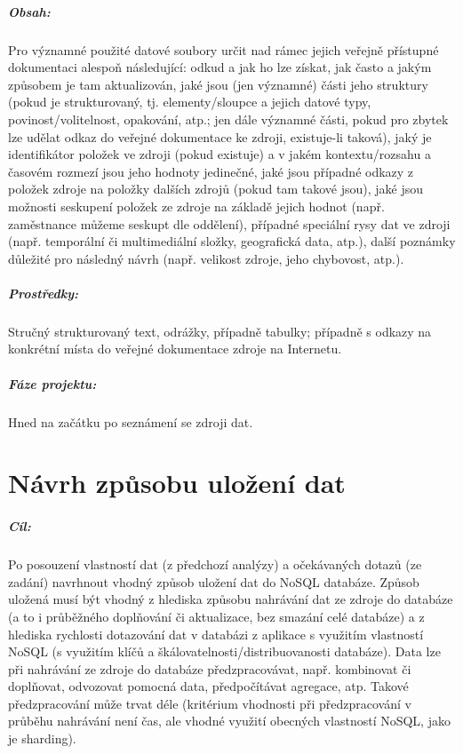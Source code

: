 \documentclass[10pt,xcolor=pdflatex,dvipsnames,table,oneside]{book}
\begin{document}
\paragraph{Obsah:}
Pro významné použité datové soubory určit nad rámec jejich veřejně přístupné dokumentaci alespoň následující:
odkud a jak ho lze získat,
jak často a jakým způsobem je tam aktualizován,
jaké jsou (jen významné) části jeho struktury (pokud je strukturovaný, tj. elementy/sloupce a jejich datové typy, povinost/volitelnost, opakování, atp.;
jen dále významné části, pokud pro zbytek lze udělat odkaz do veřejné dokumentace ke zdroji, existuje-li taková),
jaký je identifikátor položek ve zdroji (pokud existuje) a v jakém kontextu/rozsahu a časovém rozmezí jsou jeho hodnoty jedinečné,
jaké jsou případné odkazy z položek zdroje na položky dalších zdrojů (pokud tam takové jsou),
jaké jsou možnosti seskupení položek ze zdroje na základě jejich hodnot (např. zaměstnance můžeme seskupt dle oddělení),
případné speciální rysy dat ve zdroji (např. temporální či multimediální složky, geografická data, atp.),
další poznámky důležité pro následný návrh (např. velikost zdroje, jeho chybovost, atp.).

\paragraph{Prostředky:}
Stručný strukturovaný text, odrážky, případně tabulky; případně s odkazy na konkrétní místa do veřejné dokumentace zdroje na Internetu.

\paragraph{Fáze projektu:}
Hned na začátku po seznámení se zdroji dat.

\chapter{Návrh způsobu uložení dat}

\paragraph{Cíl:}
Po posouzení vlastností dat (z předchozí analýzy) a očekávaných dotazů (ze zadání) navrhnout vhodný způsob uložení dat do NoSQL databáze.
Způsob uložená musí být vhodný z hlediska způsobu nahrávání dat ze zdroje do databáze (a to i průběžného doplňování či aktualizace, bez smazání celé databáze)
a z hlediska rychlosti dotazování dat v databázi z aplikace s využitím vlastností NoSQL (s využitím klíčů a škálovatelnosti/distribuovanosti databáze).
Data lze při nahrávání ze zdroje do databáze předzpracovávat, např. kombinovat či doplňovat, odvozovat pomocná data, předpočítávat agregace, atp.
Takové předzpracování může trvat déle (kritérium vhodnosti při předzpracování v průběhu nahrávání není čas, ale vhodné využití obecných vlastností NoSQL, jako je sharding).
\end{document}

